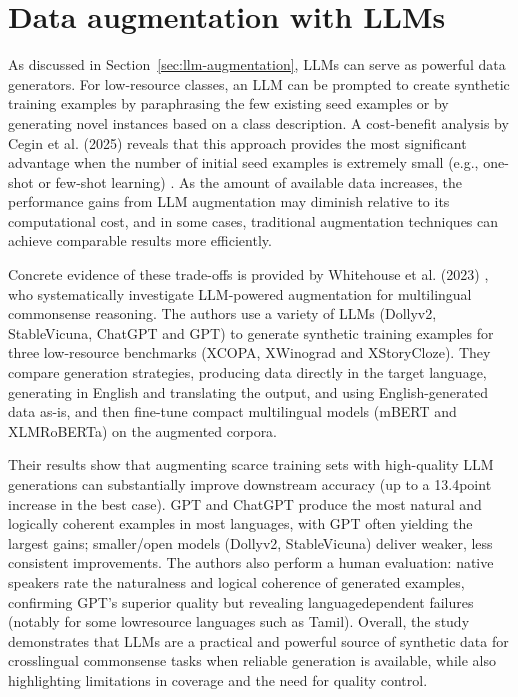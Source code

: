 \section{Data augmentation with LLMs}
As discussed in Section~\ref{sec:llm-augmentation}, LLMs can serve as powerful data generators. For low-resource classes, an LLM can be prompted to create synthetic training examples by paraphrasing the few existing seed examples or by generating novel instances based on a class description. A cost-benefit analysis by Cegin et al. (2025) reveals that this approach provides the most significant advantage when the number of initial seed examples is extremely small (e.g., one-shot or few-shot learning) \cite{cegin-etal-2025-llms}. As the amount of available data increases, the performance gains from LLM augmentation may diminish relative to its computational cost, and in some cases, traditional augmentation techniques can achieve comparable results more efficiently. \cite{cegin-etal-2025-llms}

Concrete evidence of these trade-offs is provided by Whitehouse et al. (2023) \cite{whitehouse2023llm}, who systematically investigate LLM-powered augmentation for multilingual commonsense reasoning. The authors use a variety of LLMs (Dolly\-v2, StableVicuna, ChatGPT and GPT) to generate synthetic training examples for three low-resource benchmarks (XCOPA, XWinograd and XStoryCloze). They compare generation strategies, producing data directly in the target language, generating in English and translating the output, and using English-generated data as-is, and then fine-tune compact multilingual models (mBERT and XLM\-RoBERTa) on the augmented corpora.

Their results show that augmenting scarce training sets with high-quality LLM generations can substantially improve downstream accuracy (up to a 13.4\-point increase in the best case). GPT and ChatGPT produce the most natural and logically coherent examples in most languages, with GPT often yielding the largest gains; smaller/open models (Dolly\-v2, StableVicuna) deliver weaker, less consistent improvements. The authors also perform a human evaluation: native speakers rate the naturalness and logical coherence of generated examples, confirming GPT's superior quality but revealing language\-dependent failures (notably for some low\-resource languages such as Tamil). Overall, the study demonstrates that LLMs are a practical and powerful source of synthetic data for cross\-lingual commonsense tasks when reliable generation is available, while also highlighting limitations in coverage and the need for quality control.
